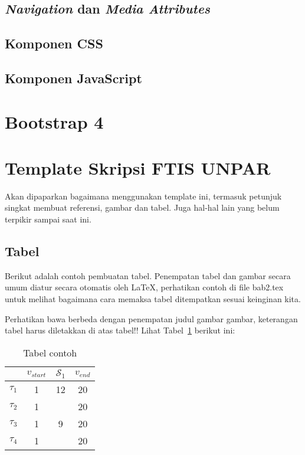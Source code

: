 \begin{enumerate}
\subsection{\textit{Navigation} dan \textit{Media Attributes}}
\label{subs:view}

\subsection{Komponen CSS}
\label{subs:css_zurb}

\subsection{Komponen JavaScript}
\label{subs:css_javascript}
 

\section{Bootstrap 4}
\label{sec:bootstrap4}
 
\section{Template Skripsi FTIS UNPAR}
\label{sec:template}
 
Akan dipaparkan bagaimana menggunakan template ini, termasuk petunjuk singkat membuat referensi, gambar dan tabel.
Juga hal-hal lain yang belum terpikir sampai saat ini. 
 

\subsection{Tabel}  
Berikut adalah contoh pembuatan tabel. 
Penempatan tabel dan gambar secara umum diatur secara otomatis oleh \LaTeX{}, perhatikan contoh di file bab2.tex untuk melihat bagaimana cara memaksa tabel ditempatkan sesuai keinginan kita.

Perhatikan bawa berbeda dengan penempatan judul gambar gambar, keterangan tabel harus diletakkan di atas tabel!!
Lihat Tabel~\ref{tab:contoh1} berikut ini:

\begin{table}[H] %
	\centering 
	\caption{Tabel contoh}
	\label{tab:contoh1}
	\begin{tabular}{cccc}
		\toprule
		& $v_{start}$ & $\mathcal{S}_{1}$ & $v_{end}$\\

		\midrule
		$\tau_{1}$ & 1 & 12& 20\\
		$\tau_{2}$ & 1 &  & 20\\
		$\tau_{3}$ & 1 & 9 & 20\\
		$\tau_{4}$ & 1 &  & 20\\


\end{tabular}
\end{table}
\end{enumerate}
